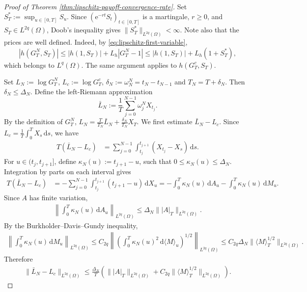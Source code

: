 \documentclass[10pt,a4paper]{amsart}
\begin{document}
\begin{proof}[Proof of Theorem \ref{thm:lipschitz-payoff-convergence-rate}]
    Set $S_T^* := \sup_{u\in[0,T]}S_u$. Since $(\mathrm e^{-rt}S_t)_{t\in[0,T]}$ is a martingale, $r\geq0$, and $S_T\in L^{2q}(\Omega)$, Doob's inequality gives $\|S_T^*\|_{L^{2q}(\Omega)}<\infty$. Note also that the prices are well defined. Indeed, by
    \eqref{eq:lipschitz-first-variable},
    \[
        |h(G_T^N,S_T)| \leq |h(1,S_T)| + L_h|G_T^N-1| \leq |h(1,S_T)| + L_h(1+S_T^*),
    \]
    which belongs to $L^q(\Omega)$. The same argument applies to $h(G_T^c,S_T)$.
    
    Set $L_N:=\log G_T^N$, $L_c:=\log G_T^c$, $\delta_N:=\omega_N^N=t_N-t_{N-1}$ and $T_N=T+\delta_N$. Then $\delta_N\leq\Delta_N$. Define the left-Riemann approximation
    \[
        \bar L_N := \frac1T \sum_{j=0}^{N-1} \omega_j^N X_{t_j}.
    \]
    By the definition of $G_T^N$, $L_N = \frac{T}{T_N}\bar L_N + \frac{\delta_N}{T_N}X_T$. We first estimate $\bar L_N-L_c$. Since $L_c = \frac1T\int_0^T X_s\,\mathrm ds$, we have 
    \begin{align*}
        T(\bar L_N-L_c) &= \sum_{j=0}^{N-1} \int_{t_j}^{t_{j+1}} (X_{t_j}-X_s)\,\mathrm ds.
    \end{align*}
    For $u\in(t_j,t_{j+1}]$, define $\kappa_N(u):=t_{j+1}-u$, such that $0\leq\kappa_N(u)\leq\Delta_N$. Integration by parts on each interval gives
    \begin{align}\label{eq:log-riemann-error}
        T(\bar L_N-L_c) &= -\sum_{j=0}^{N-1} \int_{t_j}^{t_{j+1}} (t_{j+1}-u)\,\mathrm dX_u
        = -\int_0^T\kappa_N(u)\,\mathrm dA_u - \int_0^T\kappa_N(u)\,\mathrm dM_u.
    \end{align}
    Since $A$ has finite variation, 
    \begin{align}\label{eq:A-riemann-bound}
        \left\| \int_0^T\kappa_N(u)\,\mathrm dA_u \right\|_{L^{2q}(\Omega)} \leq \Delta_N \big\||A|_T\big\|_{L^{2q}(\Omega)}.
    \end{align}
    By the Burkholder--Davis--Gundy inequality,
    \begin{align*}
        \left\| \int_0^T\kappa_N(u)\,\mathrm dM_u \right\|_{L^{2q}(\Omega)} \leq C_{2q} \left\| \left( \int_0^T \kappa_N(u)^2\, \mathrm d\langle M\rangle_u \right)^{1/2} \right\|_{L^{2q}(\Omega)} \leq C_{2q}\Delta_N \big\| \langle M\rangle_T^{1/2} \big\|_{L^{2q}(\Omega)}.
    \end{align*}
    Therefore
    \begin{align}\label{eq:left-riemann-log-rate}
        \|\bar L_N-L_c\|_{L^{2q}(\Omega)} \leq \frac{\Delta_N}{T} \left( \big\||A|_T\big\|_{L^{2q}(\Omega)} + C_{2q} \big\|\langle M\rangle_T^{1/2}\big\|_{L^{2q}(\Omega)} \right).
    \end{align}


\end{proof}
\end{document}
